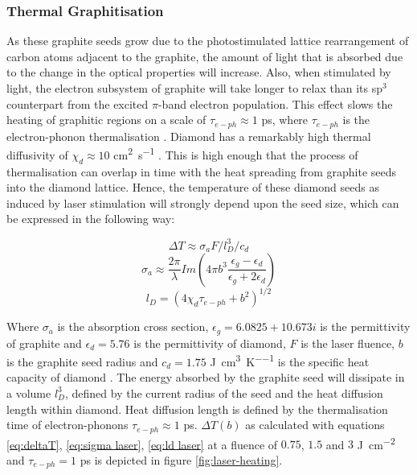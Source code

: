\begin{refsection}
\subsubsection{Thermal Graphitisation}
\label{subsubsec:thermal_graphitisation}
As these graphite seeds grow due to the photostimulated lattice rearrangement of carbon atoms adjacent to the graphite, the amount of light that is absorbed due to the change in the optical properties will increase. Also, when stimulated by light, the electron subsystem of graphite will take longer to relax than its sp$^{3}$ counterpart from the excited $\pi$-band electron population. This effect slows the heating of graphitic regions on a scale of $\tau_{e-ph}\approx1$ \si{\pico\second}, where $\tau_{e-ph}$ is the electron-phonon thermalisation \cite{seibert:1990}. Diamond has a remarkably high thermal diffusivity of $\chi_{d}\approx10$ \si{\centi\metre\squared\per\second} \cite{tokmakoff:1993}. This is high enough that the process of thermalisation can overlap in time with the heat spreading from graphite seeds into the diamond lattice. Hence, the temperature of these diamond seeds as induced by laser stimulation will strongly depend upon the seed size, which can be expressed in the following way:

\begin{equation}
\Delta T \approx\sigma_{a}F/l_{D}^{3}/c_{d}
\label{eq:deltaT}
\end{equation}
\begin{equation}
\sigma_{a} \approx \frac{2\pi}{\lambda}Im\left(4\pi b^{3}\frac{\epsilon_{g}-\epsilon_{d}}{\epsilon_{g}+2\epsilon_{d}}\right)
\label{eq:sigma laser}
\end{equation}
\begin{equation}
l_{D} = \left(4\chi_{d}\tau_{e-ph}+b^{2}\right)^{1/2}
\label{eq:ld laser}
\end{equation}

Where $\sigma_{a}$ is the absorption cross section, $\epsilon_{g}=6.0825+10.673i$ \cite{djurisic:1999} is the permittivity of graphite and $\epsilon_{d}=5.76$ \cite{phillip:1964} is the permittivity of diamond, $F$ is the laser fluence, $b$ is the graphite seed radius and $c_{d}=1.75$ \si{\joule\per\centi\metre\cubed\per\kelvin} is the specific heat capacity of diamond \cite{prelas:1997}. The energy absorbed by the graphite seed will dissipate in a volume $l_{D}^{3}$, defined by the current radius of the seed and the heat diffusion length within diamond. Heat diffusion length is defined by the thermalisation time of electron-phonons  $\tau_{e-ph}\approx1$ \si{\pico\second}. $\Delta T\left(b\right)$ as calculated with equations \ref{eq:deltaT}, \ref{eq:sigma laser}, \ref{eq:ld laser} at a fluence of $0.75$, $1.5$ and $3$ \si{\joule\per\centi\metre\squared} and $\tau_{e-ph}=1$ \si{\pico\second} is depicted in figure \ref{fig:laser-heating}.


\end{refsection}
